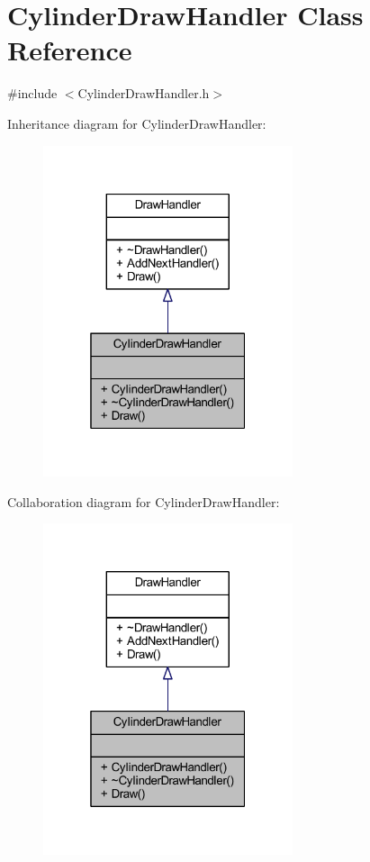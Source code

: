 \hypertarget{class_cylinder_draw_handler}{}\section{Cylinder\+Draw\+Handler Class Reference}
\label{class_cylinder_draw_handler}


{\ttfamily \#include $<$Cylinder\+Draw\+Handler.\+h$>$}



Inheritance diagram for Cylinder\+Draw\+Handler\+:\nopagebreak
\begin{figure}[H]
\begin{center}
\leavevmode
\includegraphics[width=208pt]{class_cylinder_draw_handler__inherit__graph}
\end{center}
\end{figure}


Collaboration diagram for Cylinder\+Draw\+Handler\+:\nopagebreak
\begin{figure}[H]
\begin{center}
\leavevmode
\includegraphics[width=208pt]{class_cylinder_draw_handler__coll__graph}
\end{center}
\end{figure}
